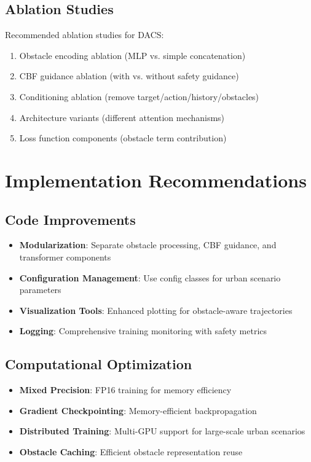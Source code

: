 \documentclass[12pt]{article}
\begin{document}
\subsection{Ablation Studies}

Recommended ablation studies for DACS:

\begin{enumerate}
    \item Obstacle encoding ablation (MLP vs. simple concatenation)
    \item CBF guidance ablation (with vs. without safety guidance)
    \item Conditioning ablation (remove target/action/history/obstacles)
    \item Architecture variants (different attention mechanisms)
    \item Loss function components (obstacle term contribution)
\end{enumerate}

\section{Implementation Recommendations}

\subsection{Code Improvements}

\begin{itemize}
    \item \textbf{Modularization}: Separate obstacle processing, CBF guidance, and transformer components
    \item \textbf{Configuration Management}: Use config classes for urban scenario parameters
    \item \textbf{Visualization Tools}: Enhanced plotting for obstacle-aware trajectories
    \item \textbf{Logging}: Comprehensive training monitoring with safety metrics
\end{itemize}

\subsection{Computational Optimization}

\begin{itemize}
    \item \textbf{Mixed Precision}: FP16 training for memory efficiency
    \item \textbf{Gradient Checkpointing}: Memory-efficient backpropagation
    \item \textbf{Distributed Training}: Multi-GPU support for large-scale urban scenarios
    \item \textbf{Obstacle Caching}: Efficient obstacle representation reuse
\end{itemize}
\end{document}
